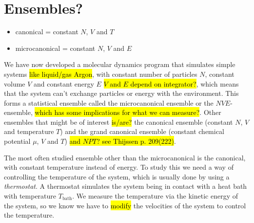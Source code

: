 \chapter{Ensembles?}

\begin{itemize}
    \item canonical = constant $N$, $V$ and $T$
    \item microcanonical = constant $N$, $V$ and $E$
\end{itemize}


We have now developed a molecular dynamics program that simulates simple systems \hl{like liquid/gas Argon}, with constant number of particles $N$, constant volume $V$ and constant energy $E$ \hl{$V$ and $E$ depend on integrator?}, which means that the system can't exchange particles or energy with the environment. This forms a statistical ensemble called the microcanonical ensemble or the $NVE$-ensemble, \hl{which has some implications for what we can measure?}. Other ensembles that might be of interest \hl{is/are?} the canonical ensemble (constant $N$, $V$ and temperature $T$) and the grand canonical ensemble (constant chemical potential $\mu$, $V$ and $T$) \hl{and $NPT$? see Thijssen p. 209(222)}.


The most often studied ensemble other than the microcanonical is the canonical, with constant temperature instead of energy. To study this we need a way of controlling the temperature of the system, which is usually done by using a \emph{thermostat}. A thermostat simulates the system being in contact with a heat bath with temperature $T_\text{bath}$.  We measure the temperature via the kinetic energy of the system, so we know we have to \hl{modify} the velocities of the system to control the temperature. 


